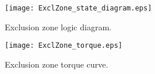 \begin{figure}[t]
\centerline{
\texttt{[image: ExclZone\_state\_diagram.eps]} }
\caption{Exclusion zone logic diagram. \label{f:EZ_SD}}
\end{figure}

\begin{figure}[t]
\centerline{
\texttt{[image: ExclZone\_torque.eps]} }
\caption{Exclusion zone torque curve. \label{f:EZ_torque}}
\end{figure}










